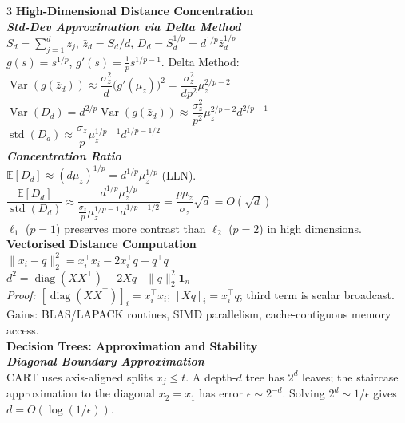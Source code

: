 \documentclass[a4paper,7pt]{article}
\begin{document}
\begin{multicols*}{3}
\textbf{High-Dimensional Distance Concentration}\\
\textit{\textbf{Std-Dev Approximation via Delta Method}}\\
$S_d=\sum_{j=1}^d z_j$, $\bar z_d=S_d/d$, $D_d=S_d^{1/p}=d^{1/p}\bar z_d^{1/p}$\\
$g(s)=s^{1/p}$, $g'(s)=\tfrac{1}{p}s^{1/p-1}$. Delta Method:\\
$\operatorname{Var}(g(\bar z_d))\approx\dfrac{\sigma_z^2}{d}\bigl(g'(\mu_z)\bigr)^2=\dfrac{\sigma_z^2}{dp^2}\mu_z^{2/p-2}$\\
$\operatorname{Var}(D_d)=d^{2/p}\operatorname{Var}(g(\bar z_d))\approx\dfrac{\sigma_z^2}{p^2}\mu_z^{2/p-2}d^{2/p-1}$\\
$\operatorname{std}(D_d)\approx\dfrac{\sigma_z}{p}\mu_z^{1/p-1}d^{1/p-1/2}$\\

\textit{\textbf{Concentration Ratio}}\\
$\mathbb{E}[D_d]\approx(d\mu_z)^{1/p}=d^{1/p}\mu_z^{1/p}$ (LLN).\\
$\dfrac{\mathbb{E}[D_d]}{\operatorname{std}(D_d)}\approx\dfrac{d^{1/p}\mu_z^{1/p}}{\frac{\sigma_z}{p}\mu_z^{1/p-1}d^{1/p-1/2}}=\dfrac{p\mu_z}{\sigma_z}\sqrt{d}=O(\sqrt{d})$\\
$\ell_1$ ($p{=}1$) preserves more contrast than $\ell_2$ ($p{=}2$) in high dimensions.\\

\textbf{Vectorised Distance Computation}\\
$\|x_i-q\|_2^2=x_i^\top x_i-2x_i^\top q+q^\top q$\\
$d^2=\operatorname{diag}(XX^\top)-2Xq+\|q\|_2^2\mathbf{1}_n$\\
\textit{Proof:} $[\operatorname{diag}(XX^\top)]_i=x_i^\top x_i$; $[Xq]_i=x_i^\top q$; third term is scalar broadcast.\\
Gains: BLAS/LAPACK routines, SIMD parallelism, cache-contiguous memory access.\\

\textbf{Decision Trees: Approximation and Stability}\\

\textit{\textbf{Diagonal Boundary Approximation}}\\
CART uses axis-aligned splits $x_j\leq t$. A depth-$d$ tree has $2^d$ leaves; the staircase approximation to the diagonal $x_2=x_1$ has error $\epsilon\sim 2^{-d}$. Solving $2^d\sim 1/\epsilon$ gives $d=O(\log(1/\epsilon))$.\\


\end{multicols*}
\end{document}
